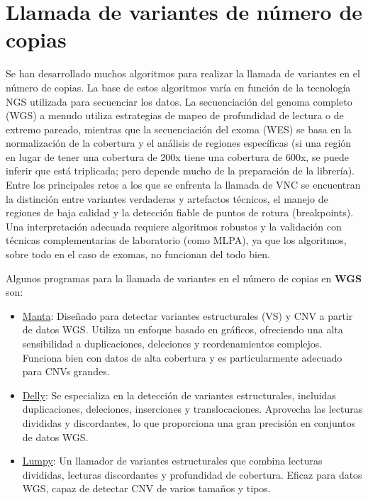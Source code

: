 \section{Llamada de variantes de número de copias}
Se han desarrollado muchos algoritmos para realizar la llamada de variantes en el número de copias.
La base de estos algoritmos varía en función de la tecnología NGS utilizada para secuenciar los datos.
La secuenciación del genoma completo (WGS) a menudo utiliza estrategias de mapeo de profundidad de lectura o de extremo pareado, mientras que la secuenciación del exoma (WES) se basa en la normalización de la cobertura y el análisis de regiones específicas (si una región en lugar de tener una cobertura de 200x tiene una cobertura de 600x, se puede inferir que está triplicada; pero depende mucho de la preparación de la librería). 
Entre los principales retos a los que se enfrenta la llamada de VNC se encuentran la distinción entre variantes verdaderas y artefactos técnicos, el manejo de regiones de baja calidad y la detección fiable de puntos de rotura (breakpoints).
Una interpretación adecuada requiere algoritmos robustos y la validación con técnicas complementarias de laboratorio (como MLPA), ya que los algoritmos, sobre todo en el caso de exomas, no funcionan del todo bien.

Algunos programas para la llamada de variantes en el número de copias en \textbf{WGS} son:
\begin{itemize}
\item \href{https://github.com/Illumina/manta}{Manta}: Diseñado para detectar variantes estructurales (VS) y CNV a partir de datos WGS. Utiliza un enfoque basado en gráficos, ofreciendo una alta sensibilidad a duplicaciones, deleciones y reordenamientos complejos. Funciona bien con datos de alta cobertura y es particularmente adecuado para CNVs grandes.
\item \href{https://github.com/dellytools/delly}{Delly}: Se especializa en la detección de variantes estructurales, incluidas duplicaciones, deleciones, inserciones y translocaciones. Aprovecha las lecturas divididas y discordantes, lo que proporciona una gran precisión en conjuntos de datos WGS.
\item \href{https://genomebiology.biomedcentral.com/articles/10.1186/gb-2014-15-6-r84}{Lumpy}: Un llamador de variantes estructurales que combina lecturas divididas, lecturas discordantes y profundidad de cobertura. Eficaz para datos WGS, capaz de detectar CNV de varios tamaños y tipos.
\end{itemize}

